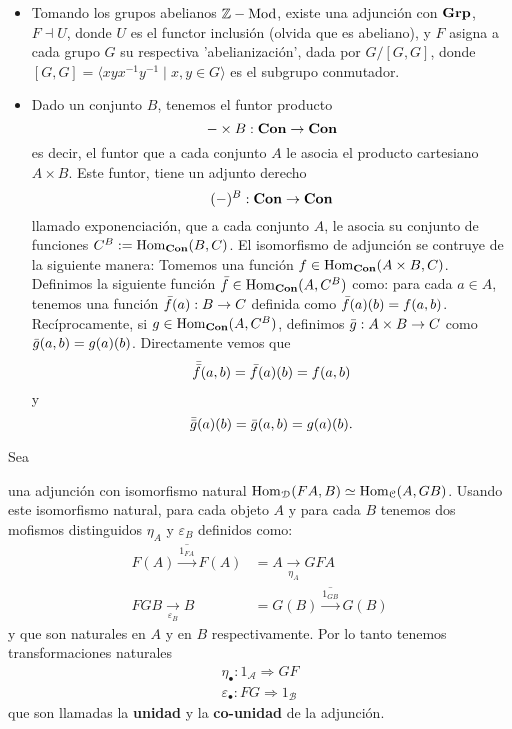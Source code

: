 \documentclass{comunicaciones}
\begin{document}
\begin{ej}
\begin{itemize}
		\item
		Tomando los grupos abelianos $\mathbb Z-\mathrm{Mod}$, existe una adjunción con $\mathbf{Grp}$, $F\dashv U$, donde $U$ es el functor inclusión (olvida que es abeliano), y $F$ asigna a cada grupo $G$ su respectiva 'abelianización', dada por $G/[G,G]$,
		donde $[G,G]=\langle xyx^{-1}y^{-1}\mid x,y\in G\rangle$
		es el subgrupo conmutador.
		
		\item Dado un conjunto $B$, tenemos el funtor producto 
		\begin{equation*}
			{-}\times B:\mathbf{Con}\to \mathbf{Con}
		\end{equation*}
		es decir, el funtor que a cada conjunto $A$ le asocia el producto cartesiano $A\times B$. Este funtor, tiene un adjunto derecho 
		\begin{equation*}
			({-})^B:\mathbf{Con}\to \mathbf{Con}
		\end{equation*}
		llamado exponenciaci\'on, que a cada conjunto $A$, le asocia su conjunto de funciones $C^B:=\mathrm{Hom}_{\mathbf{Con}}(B,C)$. El isomorfismo de adjunci\'on se contruye de la siguiente manera: Tomemos una funci\'on $f\in\mathrm{Hom}_{\mathbf{Con}}(A\times B, C)$. Definimos la siguiente funci\'on $\Bar{f}\in \mathrm{Hom}_{\mathbf{Con}}(A,C^B)$ como: para cada $a\in A$, tenemos una funci\'on $\Bar{f}(a):B\to C$ definida como $\Bar{f}(a)(b)=f(a,b)$. Rec\'iprocamente, si $g\in\mathrm{Hom}_{\mathbf{Con}}(A,C^B)$, definimos $\Bar{g}:A\times B\to C$ como $\Bar{g}(a,b)=g(a)(b)$. Directamente vemos que 
		\[\Bar{\Bar{f}}(a,b)=\Bar{f}(a)(b)=f(a,b)\]
		y 
		\[\Bar{\Bar{g}}(a)(b)=\Bar{g}(a,b)=g(a)(b).\]
	\end{itemize}
\end{ej}

\bigskip

Sea
\begin{center}
\end{center}
una adjunci\'on con isomorfismo natural $\mathrm{Hom}_\mathcal{D}(FA,B)\simeq\mathrm{Hom}_\mathcal{C}(A,GB)$. Usando este isomorfismo natural, para cada objeto $A$ y para cada $B$ tenemos dos mofismos distinguidos $\eta_A$ y $\varepsilon_B$ definidos como:
\begin{align*}
	\overline{{F(A)\overset{1_{FA}}{\longrightarrow}F(A)}} & =  {A\underset{\eta_A}{\longrightarrow}GFA}\\
	{FGB\underset{\varepsilon_B}{\longrightarrow}B} & = \overline{{G(B)\overset{1_{GB}}{\longrightarrow}G(B)}}
\end{align*}
y que son naturales en $A$ y en $B$ respectivamente. Por lo tanto tenemos transformaciones naturales
\begin{align*}
	\eta_\bullet: 1_\mathcal{A}\Rightarrow GF \\
	\varepsilon_\bullet: FG\Rightarrow 1_\mathcal{B}
\end{align*}
que son llamadas la \textbf{unidad} y la \textbf{co-unidad} de la adjunción.
\end{document}
